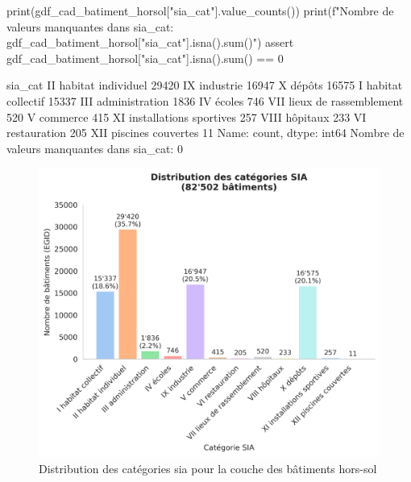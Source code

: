 \begin{code}[H]
    \begin{pythoncode}
    print(gdf_cad_batiment_horsol["sia_cat"].value_counts())
    print(f"Nombre de valeurs manquantes dans sia_cat: {gdf_cad_batiment_horsol["sia_cat"].isna().sum()}")
    assert gdf_cad_batiment_horsol["sia_cat"].isna().sum() == 0
    \end{pythoncode}
    \vspace{0.35cm}
    \begin{textcode}
    sia_cat
    II habitat individuel         29420
    IX industrie                  16947
    X dépôts                      16575
    I habitat collectif           15337
    III administration             1836
    IV écoles                       746
    VII lieux de rassemblement      520
    V commerce                      415
    XI installations sportives      257
    VIII hôpitaux                   233
    VI restauration                 205
    XII piscines couvertes           11
    Name: count, dtype: int64
    Nombre de valeurs manquantes dans sia_cat: 0
    \end{textcode}
    \label{code:categorie_sia_distribution_verification}
\end{code}

\begin{figure}[H]
    \centering
    \includegraphics[width=1\linewidth]{02-main//figures//ch3/ch3_preparation_donnees_categorie_sia_01_barplot.png}
    \caption{Distribution des catégories \gls{sia} pour la couche des bâtiments hors-sol}
    \label{fig:ch3_preparation_donnees_categorie_sia_01_barplot}
\end{figure}

